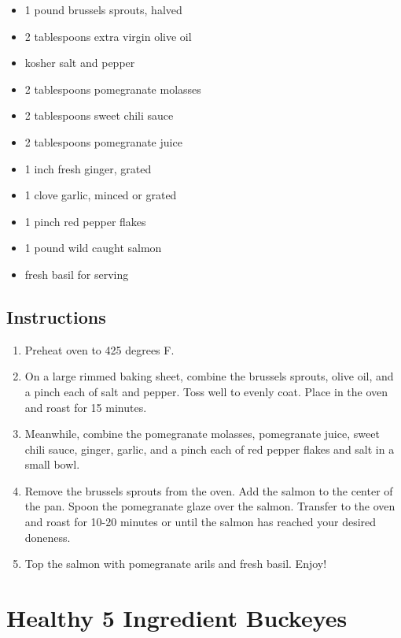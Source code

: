 \documentclass[
  letterpaper,
  DIV=11,
  numbers=noendperiod,
  titlepage=false]{scrreprt}
\providecommand{\tightlist}{%
  \setlength{\itemsep}{0pt}\setlength{\parskip}{0pt}}\usepackage{longtable,booktabs,array}
\begin{document}
\begin{itemize}
\tightlist
\item
  1 pound brussels sprouts, halved
\item
  2 tablespoons extra virgin olive oil
\item
  kosher salt and pepper
\item
  2 tablespoons pomegranate molasses
\item
  2 tablespoons sweet chili sauce
\item
  2 tablespoons pomegranate juice
\item
  1 inch fresh ginger, grated
\item
  1 clove garlic, minced or grated
\item
  1 pinch red pepper flakes
\item
  1 pound wild caught salmon
\item
  fresh basil for serving
\end{itemize}

\section{Instructions}\label{instructions-57}

\begin{enumerate}
\def\labelenumi{\arabic{enumi}.}
\tightlist
\item
  Preheat oven to 425 degrees F.
\item
  On a large rimmed baking sheet, combine the brussels sprouts, olive
  oil, and a pinch each of salt and pepper. Toss well to evenly coat.
  Place in the oven and roast for 15 minutes.
\item
  Meanwhile, combine the pomegranate molasses, pomegranate juice, sweet
  chili sauce, ginger, garlic, and a pinch each of red pepper flakes and
  salt in a small bowl.
\item
  Remove the brussels sprouts from the oven. Add the salmon to the
  center of the pan. Spoon the pomegranate glaze over the salmon.
  Transfer to the oven and roast for 10-20 minutes or until the salmon
  has reached your desired doneness.
\item
  Top the salmon with pomegranate arils and fresh basil. Enjoy!
\end{enumerate}


\chapter{Healthy 5 Ingredient
Buckeyes}\label{healthy-5-ingredient-buckeyes}
\end{document}
